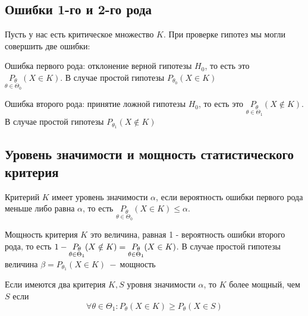 \subsection{Ошибки 1-го и 2-го рода}
Пусть у нас есть критическое множество $K$. При проверке гипотез мы могли совершить две ошибки:
\begin{definition*}
Ошибка первого рода: отклонение верной гипотезы $H_0$, то есть это $\underset{\theta\in\Theta_0}{P_\theta}(X\in K)$. В случае простой гипотезы $P_{\theta_0}(X\in K)$
\end{definition*}
\begin{definition*}
Ошибка второго рода: принятие ложной гипотезы $H_0$, то есть это $\underset{\theta\in\Theta_1}{P_\theta}(X\notin K)$. В случае простой гипотезы $P_{\theta_1}(X\notin K)$
\end{definition*}

\subsection{Уровень значимости и мощность статистического критерия}
\begin{definition*}
Критерий $K$ имеет уровень значимости $\alpha$, если вероятность ошибки первого рода меньше либо равна $\alpha$, то есть $\underset{\theta\in\Theta_0}{P_\theta}(X\in K)\leq\alpha$.
\end{definition*}

\begin{definition*}
Мощность критерия $K$ это величина, равная 1 - вероятность ошибки второго рода, то есть $\\ 1-\underset{\theta\in\Theta_1}{P_\theta}(X\notin K)=\underset{\theta\in\Theta_1}{P_\theta}(X\in K)$. В случае простой гипотезы величина $\beta=P_{\theta_1}(X\in K)~-~$мощность
\end{definition*} 

Если имеются два критерия $K,S$ уровня значимости $\alpha$, то $K$ более мощный, чем $S$ если $$\forall\theta\in\Theta_1\colon P_\theta(X\in K)\geq P_\theta(X\in S)$$
